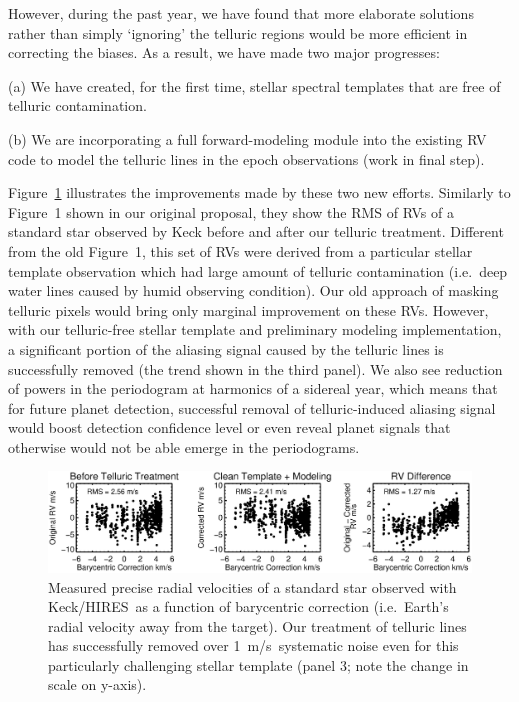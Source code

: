 \documentclass[12pt]{article}
\def\mps{m/s}
\def\keck{Keck/HIRES}
\begin{document}
However, during the past year, we have found that more elaborate
solutions rather than simply `ignoring' the telluric regions would
be more efficient in correcting the biases. As a result, we have made
two major progresses:

(a) We have created, for the first time, stellar spectral templates
that are free of telluric contamination.

(b) We are incorporating a full forward-modeling module into the
existing RV code to model the telluric lines in the epoch
observations (work in final step).

Figure~\ref{fig:tell} illustrates the improvements made by these two
new efforts. Similarly to Figure~1 shown in our original proposal,
they show the RMS of RVs of a standard star observed by Keck before
and after our telluric treatment. Different
from the old Figure~1, this set of RVs were derived from a particular
stellar template observation which had large amount of telluric
contamination (i.e.\ deep water lines caused by humid observing
condition). Our old approach of masking telluric pixels would bring
only marginal improvement on these RVs. However, with our
telluric-free stellar template and preliminary modeling
implementation, a significant portion of the aliasing signal caused by
the telluric lines is successfully removed (the trend shown in the
third panel). We also see reduction of powers in the periodogram at
harmonics of a sidereal year, which means that for future planet
detection, successful removal of telluric-induced aliasing signal
would boost detection confidence level or even reveal planet signals
that otherwise would not be able emerge in the periodograms.

\begin{figure}[thb]
  \vspace{-3pt}
  \begin{center}
    \includegraphics[width=\textwidth]{185144_BC_RV_rj172_4panel}
  \end{center}
  \vspace{-25pt}  
  \caption{Measured precise radial velocities of a standard star
    observed with \keck\ as a function of barycentric correction
    (i.e.~Earth's radial velocity away from the target). Our
    treatment of telluric lines has successfully removed over
    1~\mps\ systematic noise even for this particularly challenging
    stellar template (panel 3; note the change in scale on
    y-axis).} 
  \vspace{-8pt}  
  \label{fig:tell}
\end{figure}
\end{document}
